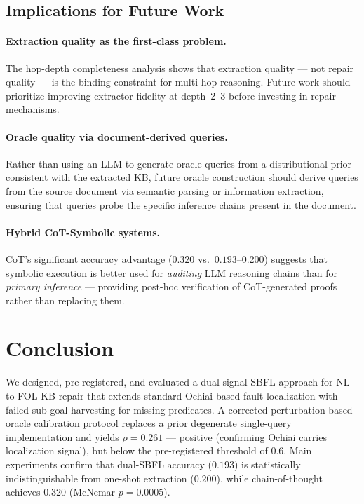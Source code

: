 \documentclass[11pt,letterpaper]{article}
\begin{document}
\subsection{Implications for Future Work}

\paragraph{Extraction quality as the first-class problem.} The hop-depth completeness analysis shows that extraction quality — not repair quality — is the binding constraint for multi-hop reasoning. Future work should prioritize improving extractor fidelity at depth~2--3 before investing in repair mechanisms.

\paragraph{Oracle quality via document-derived queries.} Rather than using an LLM to generate oracle queries from a distributional prior consistent with the extracted KB, future oracle construction should derive queries from the source document via semantic parsing or information extraction, ensuring that queries probe the specific inference chains present in the document.

\paragraph{Hybrid CoT-Symbolic systems.} CoT's significant accuracy advantage ($0.320$ vs.\ $0.193$--$0.200$) suggests that symbolic execution is better used for \emph{auditing} LLM reasoning chains than for \emph{primary inference} — providing post-hoc verification of CoT-generated proofs rather than replacing them.

\section{Conclusion}

We designed, pre-registered, and evaluated a dual-signal SBFL approach for NL-to-FOL KB repair that extends standard Ochiai-based fault localization with failed sub-goal harvesting for missing predicates. A corrected perturbation-based oracle calibration protocol replaces a prior degenerate single-query implementation and yields $\rho = 0.261$ — positive (confirming Ochiai carries localization signal), but below the pre-registered threshold of $0.6$. Main experiments confirm that dual-SBFL accuracy ($0.193$) is statistically indistinguishable from one-shot extraction ($0.200$), while chain-of-thought achieves $0.320$ (McNemar $p = 0.0005$).
\end{document}
